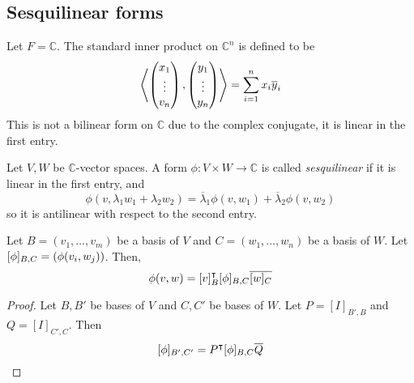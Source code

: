 \subsection{Sesquilinear forms}
Let \( F = \mathbb C \).
The standard inner product on \( \mathbb C^n \) is defined to be
\[
	\left\langle{\begin{pmatrix} x_1 \\ \vdots \\ v_n \end{pmatrix}, \begin{pmatrix} y_1 \\ \vdots \\ y_n \end{pmatrix}}\right\rangle = \sum_{i=1}^n x_i \overline y_i
\]
This is not a bilinear form on \( \mathbb C \) due to the complex conjugate, it is linear in the first entry.
\begin{definition}
	Let \( V, W \) be \( \mathbb C \)-vector spaces.
	A form \( \phi \colon V \times W \to \mathbb C \) is called \textit{sesquilinear} if it is linear in the first entry, and
	\[
		\phi(v, \lambda_1 w_1 + \lambda_2 w_2) = \overline \lambda_1 \phi(v,w_1) + \overline \lambda_2 \phi(v,w_2)
	\]
	so it is antilinear with respect to the second entry.
\end{definition}
\begin{lemma}
	Let \( B = (v_1, \dots, v_m) \) be a basis of \( V \) and \( C = (w_1, \dots, w_n) \) be a basis of \( W \).
	Let \( [\phi]_{B,C} = \qty(\phi(v_i, w_j)) \).
	Then,
	\[
		\phi(v,w) = [v]_B^\intercal [\phi]_{B,C} \overline{[w]_C}
	\]
\end{lemma}
\begin{proof}
	Let \( B, B' \) be bases of \( V \) and \( C, C' \) be bases of \( W \).
	Let \( P = [I]_{B', B} \) and \( Q = [I]_{C', C} \).
	Then
	\[
		[\phi]_{B', C'} = P^\intercal [\phi]_{B,C} \overline Q
	\]
\end{proof}

